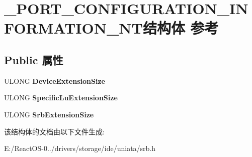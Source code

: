 \hypertarget{struct___p_o_r_t___c_o_n_f_i_g_u_r_a_t_i_o_n___i_n_f_o_r_m_a_t_i_o_n___n_t}{}\section{\+\_\+\+P\+O\+R\+T\+\_\+\+C\+O\+N\+F\+I\+G\+U\+R\+A\+T\+I\+O\+N\+\_\+\+I\+N\+F\+O\+R\+M\+A\+T\+I\+O\+N\+\_\+\+N\+T结构体 参考}
\label{struct___p_o_r_t___c_o_n_f_i_g_u_r_a_t_i_o_n___i_n_f_o_r_m_a_t_i_o_n___n_t}
\subsection*{Public 属性}
\begin{DoxyCompactItemize}
\item 
\mbox{\label{struct___p_o_r_t___c_o_n_f_i_g_u_r_a_t_i_o_n___i_n_f_o_r_m_a_t_i_o_n___n_t_a14209f7a6116c4b62f5a629843bacaa6}} 
U\+L\+O\+NG {\bfseries Device\+Extension\+Size}
\item 
\mbox{\label{struct___p_o_r_t___c_o_n_f_i_g_u_r_a_t_i_o_n___i_n_f_o_r_m_a_t_i_o_n___n_t_a70dfef6f5e46b1af2aff893fab796b95}} 
U\+L\+O\+NG {\bfseries Specific\+Lu\+Extension\+Size}
\item 
\mbox{\label{struct___p_o_r_t___c_o_n_f_i_g_u_r_a_t_i_o_n___i_n_f_o_r_m_a_t_i_o_n___n_t_af45c4df350ff636ad5ad079e3a897cba}} 
U\+L\+O\+NG {\bfseries Srb\+Extension\+Size}
\end{DoxyCompactItemize}


该结构体的文档由以下文件生成\+:\begin{DoxyCompactItemize}
\item 
E\+:/\+React\+O\+S-\/0../drivers/storage/ide/uniata/srb.\+h\end{DoxyCompactItemize}
